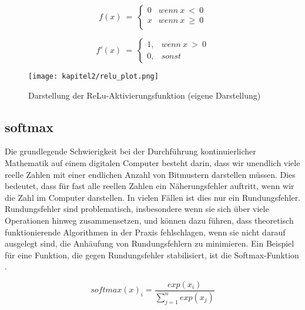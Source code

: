 \begin{equation} \label{Formel2_4}
    f( x) \ =\ \begin{cases}
        0 & wenn\ x\  <\ 0    \\
        x & wenn\ x\  \geq\ 0 \\
    \end{cases}
\end{equation}

\begin{equation} \label{Formel2_4Abl}
    f'( x) \ =\ \begin{cases}
        1, & wenn\ x\  >\ 0 \\
        0, & sonst
    \end{cases}
\end{equation}

\begin{figure}[H]
    \centering
    \texttt{[image: kapitel2/relu\_plot.png]}
    \caption[Darstellung der ReLu-Aktivierungsfunktion]{Darstellung der ReLu-Aktivierungsfunktion (eigene Darstellung)}
    \label{Kap2:ReLu_plot}
\end{figure}

\subsection{softmax}
Die grundlegende Schwierigkeit bei der Durchführung kontinuierlicher Mathematik auf einem digitalen Computer besteht darin, dass wir unendlich viele reelle Zahlen mit einer endlichen Anzahl von Bitmustern darstellen müssen. Dies bedeutet, dass für fast alle reellen Zahlen ein Näherungsfehler auftritt, wenn wir die Zahl im Computer darstellen. In vielen Fällen ist dies nur ein Rundungsfehler. Rundungsfehler sind problematisch, insbesondere wenn sie sich über viele Operationen hinweg zusammensetzen, und können dazu führen, dass theoretisch funktionierende Algorithmen in der Praxis fehlschlagen, wenn sie nicht darauf ausgelegt sind, die Anhäufung von Rundungsfehlern zu minimieren. Ein Beispiel für eine Funktion, die gegen Rundungsfehler stabilisiert, ist die Softmax-Funktion \cite*[80-81]{IanGoodfellowYoshuaBengio2016}.

\begin{equation} \label{FormelSoft}
    softmax( x)_{i} =\frac{exp( x_{i})}{\sum ^{n}_{j=1} exp( x_{j})}
\end{equation}


